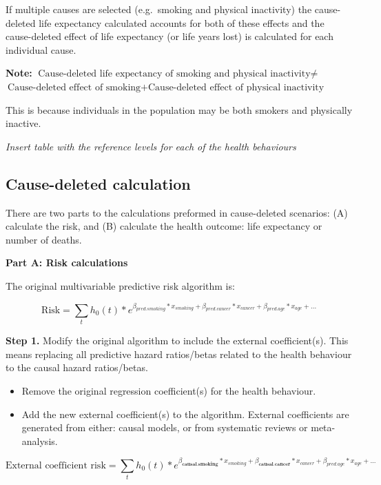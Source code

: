 \documentclass[]{book}
\providecommand{\tightlist}{%
  \setlength{\itemsep}{0pt}\setlength{\parskip}{0pt}}
\begin{document}
If multiple causes are selected (e.g.~smoking and physical inactivity)
the cause-deleted life expectancy calculated accounts for both of these
effects and the cause-deleted effect of life expectancy (or life years
lost) is calculated for each individual cause.

\textbf{Note:}
\(\text{Cause-deleted life expectancy of smoking and physical inactivity} \neq\)
\(\text{Cause-deleted effect of smoking} + \text{Cause-deleted effect of physical inactivity}\)

This is because individuals in the population may be both smokers and
physically inactive.

\emph{Insert table with the reference levels for each of the health
behaviours}

\subsection{Cause-deleted calculation}\label{cause-deleted-calculation}

There are two parts to the calculations preformed in cause-deleted
scenarios: (A) calculate the risk, and (B) calculate the health outcome:
life expectancy or number of deaths.

\textbf{Part A: Risk calculations}

The original multivariable predictive risk algorithm is:

\[ \text{Risk} = \sum_t h_0(t) * e^{\beta_{pred.smoking}*x_{smoking}+\beta_{pred.cancer}*x_{cancer} + \beta_{pred.age}*x_{age} +...}  \]

\textbf{Step 1.} Modify the original algorithm to include the external
coefficient(s). This means replacing all predictive hazard ratios/betas
related to the health behaviour to the causal hazard ratios/betas.

\begin{itemize}
\tightlist
\item
  Remove the original regression coefficient(s) for the health
  behaviour.
\item
  Add the new external coefficient(s) to the algorithm. External
  coefficients are generated from either: causal models, or from
  systematic reviews or meta-analysis.
\end{itemize}

\[ \text{External coefficient risk} = \sum_t h_0(t) * e^{{\beta_\textbf{causal.smoking}}*x_{smoking} + {{\beta_\textbf{causal.cancer}}}*x_{cancer} + \beta_{pred.age}*x_{age} +...}  \]
\end{document}
